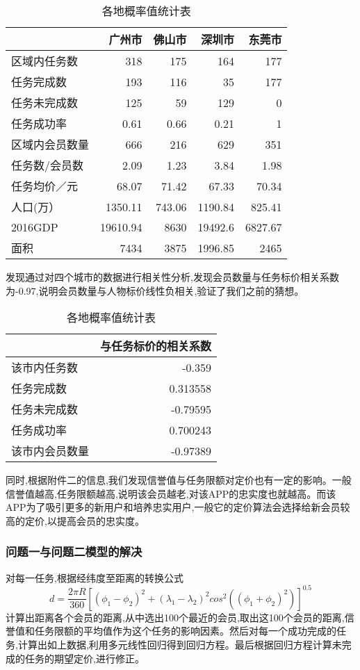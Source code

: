 \documentclass{cumcmthesis}
\begin{document}
\begin{table}[!htbp]
\centering
	\caption{各地概率值统计表}\label{Tab:2} 
	\begin{tabular}{lrrrr}
		\toprule[1.5pt]
		$ $    & {广州市} & {佛山市} & {深圳市} & {东莞市} \\
		\midrule[1pt]
		区域内任务数 & 318   & 175   & 164   & 177 \\
		任务完成数 & 193   & 116   & 35    & 177 \\
		任务未完成数 & 125   & 59    & 129   & 0 \\
		任务成功率 & 0.61  & 0.66  & 0.21  & 1 \\
		区域内会员数量 & 666   & 216   & 629   & 351 \\
		任务数/会员数 & 2.09  & 1.23  & 3.84  & 1.98 \\
		任务均价／元 & 68.07 & 71.42 & 67.33 & 70.34 \\
		人口(万） & 1350.11 & 743.06 & 1190.84 & 825.41 \\
		2016GDP & 19610.94 & 8630  & 19492.6 & 6827.67 \\
		面积    & 7434  & 3875  & 1996.85 & 2465 \\
		\bottomrule[1.5pt]
	\end{tabular}%
\end{table}
发现通过对四个城市的数据进行相关性分析,发现会员数量与任务标价相关系数为-0.97,说明会员数量与人物标价线性负相关,验证了我们之前的猜想。

\begin{table}[!htbp]
\centering
	\caption{各地概率值统计表}\label{Tab:2} 
	\begin{tabular}{lr}
		\toprule[1.5pt]
		& {与任务标价的相关系数} \\
		\midrule[1pt]
		该市内任务数 & -0.359 \\
		任务完成数 & 0.313558 \\
		任务未完成数 & -0.79595 \\
		任务成功率 & 0.700243 \\
		该市内会员数量 & -0.97389 \\
		\bottomrule[1.5pt]
	\end{tabular}%
\end{table}

同时,根据附件二的信息,我们发现信誉值与任务限额对定价也有一定的影响。一般信誉值越高,任务限额越高,说明该会员越老,对该APP的忠实度也就越高。而该APP为了吸引更多的新用户和培养忠实用户,一般它的定价算法会选择给新会员较高的定价,以提高会员的忠实度。


\subsubsection{问题一与问题二模型的解决}
对每一任务,根据经纬度至距离的转换公式
\begin{equation}
\left.
d=\frac{2\pi R}{360}\left[ \left(\phi_1-\phi_2\right)^2+  \left(\lambda_1-\lambda_2\right)^2cos^2\left(\left(\phi_1+\phi_2\right)^2\right)  \right]^{0.5}
\right.
\end{equation}
计算出距离各个会员的距离,从中选出100个最近的会员,取出这100个会员的距离,信誉值和任务限额的平均值作为这个任务的影响因素。然后对每一个成功完成的任务,计算出如上数据,利用多元线性回归得到回归方程。最后根据回归方程计算未完成的任务的期望定价,进行修正。
\end{document}
